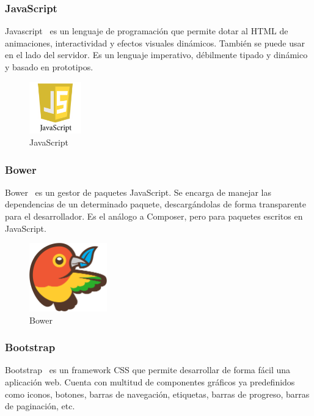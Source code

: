 \subsubsection*{JavaScript}
Javascript~\cite{javascript} es un lenguaje de programación que permite dotar al HTML de animaciones, interactividad y efectos visuales dinámicos. También se puede usar en el lado del servidor. Es un lenguaje imperativo, débilmente tipado y dinámico y basado en prototipos.

\begin{figure}[tbh]
\centering
\label{fig:javascript}
\includegraphics[width=0.2\textwidth]{imagenes/javascript}
\caption{JavaScript}
\end{figure}

\subsubsection*{Bower}
Bower~\cite{bower} es un gestor de paquetes JavaScript. Se encarga de manejar las dependencias de un determinado paquete, descargándolas de forma transparente para el desarrollador. Es el análogo a Composer, pero para paquetes escritos en JavaScript.

\begin{figure}[tbh]
\centering
\label{fig:bower}
\includegraphics[width=0.3\textwidth]{imagenes/bower}
\caption{Bower}
\end{figure}

\subsubsection*{Bootstrap}
Bootstrap~\cite{bootstrap} es un framework CSS que permite desarrollar de forma fácil una aplicación web. Cuenta con multitud de componentes gráficos ya predefinidos como iconos, botones, barras de navegación, etiquetas, barras de progreso, barras de paginación, etc.

